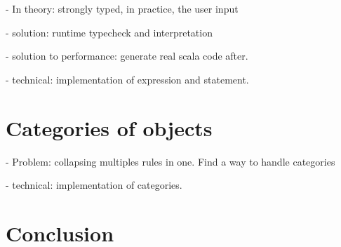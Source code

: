 \documentclass[11pt,a4paper]{article}
\begin{document}
- In theory: strongly typed, in practice, the user input 

- solution: runtime typecheck and interpretation

- solution to performance: generate real scala code after.

- technical: implementation of expression and statement.

\section{Categories of objects}

- Problem: collapsing multiples rules in one. Find a way to handle categories

- technical: implementation of categories.

\section{Conclusion}
\end{document}
